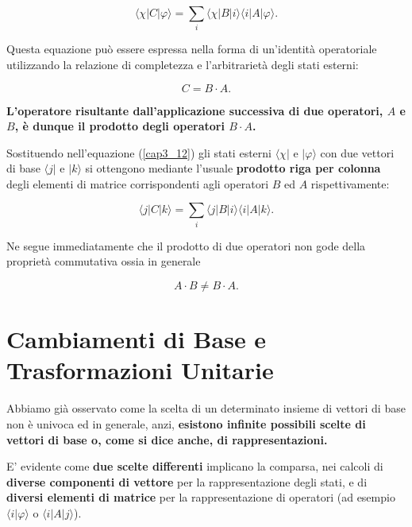 \begin{equation}
\langle \chi | C | \varphi \rangle = \sum \limits_{i} \langle \chi | B | i \rangle \langle i | A | \varphi \rangle .
\label{cap3_12}
\end{equation}

Questa equazione può essere espressa nella forma di un'identità operatoriale utilizzando la relazione di completezza e l'arbitrarietà degli stati esterni:

\begin{equation}
C= B \cdot A .
\end{equation}

\textbf{L'operatore risultante dall'applicazione successiva di due operatori, $A$ e $B$, è dunque il prodotto degli operatori $B \cdot A$.}

Sostituendo nell'equazione (\ref{cap3_12}) gli stati esterni $\langle \chi |$ e $ | \varphi \rangle $ con due vettori di base $\langle j |$ e $| k \rangle$ si ottengono mediante l'usuale \textbf{prodotto riga per colonna} degli elementi di matrice corrispondenti agli operatori $B$ ed $A$ rispettivamente:

\begin{equation}
\langle j | C | k \rangle  = \sum \limits_{i} \langle j | B | i \rangle \langle i | A | k \rangle .
\end{equation}

Ne segue immediatamente che il prodotto di due operatori non gode della proprietà commutativa ossia in generale

\begin{equation}
A \cdot B \neq B \cdot A . 
\end{equation}

\section{Cambiamenti di Base e Trasformazioni Unitarie}

Abbiamo già osservato come la scelta di un determinato insieme di vettori di base non è univoca ed in generale, anzi, \textbf{esistono infinite possibili scelte di vettori di base o, come si dice anche, di rappresentazioni.}

E' evidente come \textbf{due scelte differenti }implicano la comparsa, nei calcoli di \textbf{diverse componenti di vettore} per la rappresentazione degli stati, e di \textbf{diversi elementi di matrice} per la rappresentazione di operatori (ad esempio $\langle i | \varphi \rangle $ o  $ \langle i | A | j \rangle $).

